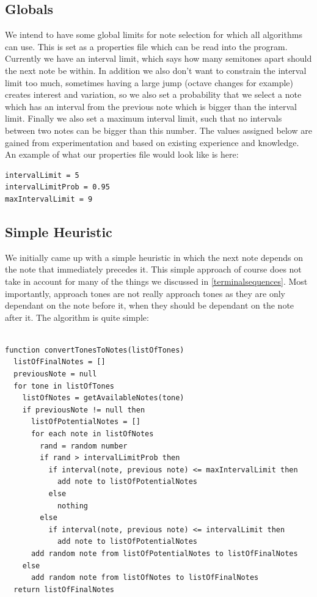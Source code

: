 \documentclass[pdftex,12pt,a4paper]{report}
\begin{document}
\subsection{Globals}
We intend to have some global limits for note selection for which all algorithms can use. This is set as a properties file which can be read into the program. Currently we have an interval limit, which says how many semitones apart should the next note be within. In addition we also don't want to constrain the interval limit too much, sometimes having a large jump (octave changes for example) creates interest and variation, so we also set a probability that we select a note which has an interval from the previous note which is bigger than the interval limit. Finally we also set a maximum interval limit, such that no intervals between two notes can be bigger than this number. The values assigned below are gained from experimentation and based on existing experience and knowledge. An example of what our properties file would look like is here:

\begin{verbatim}
intervalLimit = 5
intervalLimitProb = 0.95
maxIntervalLimit = 9
\end{verbatim}

\subsection{Simple Heuristic}
We initially came up with a simple heuristic in which the next note depends on the note that immediately precedes it. This simple approach of course does not take in account for many of the things we discussed in \ref{terminalsequences}. Most importantly, approach tones are not really approach tones as they are only dependant on the note before it, when they should be dependant on the note after it.
The algorithm is quite simple:

\begin{verbatim}

function convertTonesToNotes(listOfTones)
  listOfFinalNotes = []
  previousNote = null
  for tone in listOfTones
    listOfNotes = getAvailableNotes(tone)
    if previousNote != null then
      listOfPotentialNotes = []
      for each note in listOfNotes
        rand = random number
        if rand > intervalLimitProb then
          if interval(note, previous note) <= maxIntervalLimit then
            add note to listOfPotentialNotes
          else
            nothing
        else
          if interval(note, previous note) <= intervalLimit then
            add note to listOfPotentialNotes
      add random note from listOfPotentialNotes to listOfFinalNotes
    else
      add random note from listOfNotes to listOfFinalNotes
  return listOfFinalNotes

\end{verbatim}
\end{document}

